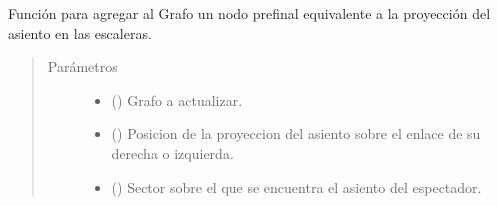 \documentclass[letterpaper,10pt,spanish]{sphinxmanual}
\begin{document}

\begin{fulllineitems}
\label{\detokenize{Funciones:Funciones.dibujarAsientoGrafoGeneral}}
\end{fulllineitems}


\begin{fulllineitems}
\label{\detokenize{Funciones:Funciones.addnodoPrefinal}}
\sphinxAtStartPar
Función para agregar al Grafo un nodo prefinal equivalente a la proyección del asiento en las escaleras.
\begin{quote}\begin{description}
\item[{Parámetros}] \leavevmode\begin{itemize}
\item {} 
\sphinxAtStartPar
{} () \textendash{} Grafo a actualizar.

\item {} 
\sphinxAtStartPar
{} () \textendash{} Posicion de la proyeccion del asiento sobre el enlace de su derecha o izquierda.

\item {} 
\sphinxAtStartPar
{} ({\hyperref[\detokenize{Clases:Clases.Sector}]{}}) \textendash{} Sector sobre el que se encuentra el asiento del espectador.


\end{itemize}
\end{description}
\end{quote}
\end{fulllineitems}
\end{document}
